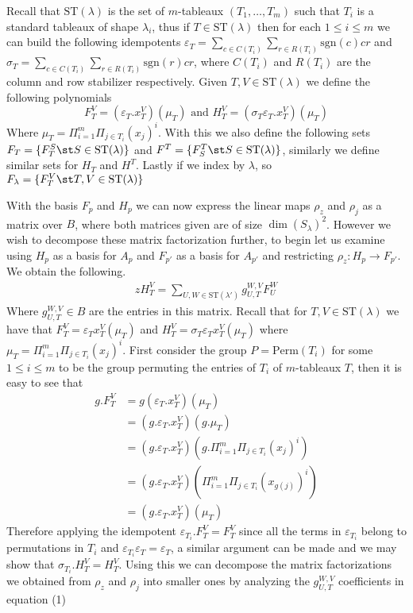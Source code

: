 \documentclass[../MT.tex]{subfiles}
\begin{document}
Recall that $ \text{ST}(\lambda) $ is the set of $ m $-tableaux $ (T_1,\hdots,T_m) $ such that $ T_i $ is a standard tableaux of shape $ \lambda_i $, thus if $ T \in \text{ST}(\lambda) $ then for each $ 1 \leq i \leq m $ we can build the following idempotents
$ \varepsilon_T = \sum_{c\in C(T_i)}\sum_{r\in R(T_i)} \text{sgn}(c)cr $ and $ \sigma_T = \sum_{c\in C(T_i)}\sum_{r\in R(T_i)} \text{sgn}(r)cr $, where $ C(T_i) $ and $ R(T_i) $ are the column and row stabilizer respectively. Given $ T,V \in \text{ST}(\lambda) $ we define the following polynomials
\[F_T^V = (\varepsilon_T.x_T^V)(\mu_T) \text{ and } H_T^V = (\sigma_T\varepsilon_T.x_T^V)(\mu_T) \]
Where $ \mu_T = \Pi_{i=1}^m\Pi_{j \in T_i} (x_j)^i $. With this we also define the following sets $ F_T = \{F_T^S \st S \in \text{ST}(\lambda)\} $ and $ F^T = \{F_S^T \st S \in \text{ST}(\lambda)\} $, similarly we define similar sets for $ H_T $ and $ H^T $. Lastly if we index by $ \lambda $, so $ F_\lambda = \{F_T^V \st T,V \in \text{ST}(\lambda)\} $

With the basis $ F_p $ and $ H_p $ we can now express the linear maps $ \rho_z $ and $ \rho_j $ as a matrix over $ B $, where
both matrices given are of size $ \dim(S_\lambda)^2 $. However we wish to decompose these matrix factorization further, to begin let us examine using $ H_p $ as a basis for $ A_p $ and $ F_{p'} $ as a basis for $ A_{p'} $ and restricting $ \rho_z:H_p \to F_{p'} $. We obtain the following.
\begin{align}zH_T^V = \sum\limits_{U,W \in \text{ST}(\lambda')}g_{U,T}^{W,V} F_U^W\end{align}
Where $ g_{U,T}^{W,V} \in B $ are the entries in this matrix. Recall that for $ T,V \in \text{ST}(\lambda) $ we have that $ F_T^V = \varepsilon_Tx_T^V(\mu_T) $ and $ H_T^V = \sigma_T\varepsilon_Tx_T^V(\mu_T) $ where $ \mu_T = \Pi_{i=1}^m\Pi_{j \in T_i}(x_j)^i $. First consider the group $ P = \text{Perm}(T_i) $ for some $ 1 \leq i \leq m $ to be the group permuting the entries of $ T_i $ of $ m $-tableaux $ T $, then it is easy to see that
\begin{align*}
g.F_T^V  &= g(\varepsilon_T.x_T^V)(\mu_T)\\
		 &= (g.\varepsilon_T.x_T^V)(g.\mu_T)\\
		 &= (g.\varepsilon_T.x_T^V)(g.\Pi_{i=1}^m\Pi_{j \in T_i}(x_j)^i) \\
		 &= (g.\varepsilon_T.x_T^V)(\Pi_{i=1}^m\Pi_{j \in T_i}(x_{g(j)})^i)\\
		 &= (g.\varepsilon_T.x_T^V)(\mu_T)
\end{align*}
Therefore applying the idempotent $ \varepsilon_{T_i}.F_T^V  = F_T^V $ since all the terms in $ \varepsilon_{T_i} $ belong to permutations in $ T_i $ and $ \varepsilon_{T_i}\varepsilon_T =\varepsilon_T $, a similar argument can be made and we may show that $ \sigma_{T_i}.H_T^V = H_T^V $. Using this we can decompose the matrix factorizations we obtained from $ \rho_z $ and $ \rho_j $ into smaller ones by analyzing the $ g_{U,T}^{W,V} $ coefficients in equation (1)
\end{document}
